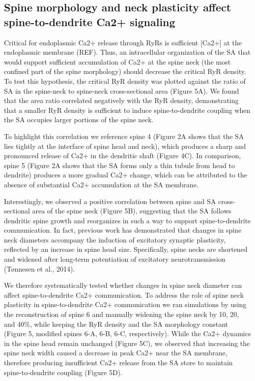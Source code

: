 \documentclass[fleqn,10pt]{wlscirep}
\begin{document}
\subsection*{Spine morphology and neck plasticity affect spine-to-dendrite Ca2+ signaling}Critical for endoplasmic Ca2+ release through RyRs is sufficient [Ca2+] at the endoplasmic membrane (REF). Thus, an intracellular organization of the SA that would support sufficient accumulation of Ca2+ at the spine neck (the most confined part of the spine morphology) should decrease the critical RyR density. To test this hypothesis, the critical RyR density was plotted against the ratio of SA in the spine-neck to spine-neck cross-sectional area (Figure 5A). We found that the area ratio correlated negatively with the RyR density, demonstrating that a smaller RyR density is sufficient to induce spine-to-dendrite coupling when the SA occupies larger portions of the spine neck.

		To highlight this correlation we reference spine 4 (Figure 2A shows that the SA lies tightly at the interface of spine head and neck), which produces a sharp and pronounced release of Ca2+ in the dendritic shaft (Figure 4C). In comparison, spine 5 (Figure 2A shows that the SA forms only a thin tubule from head to dendrite) produces a more gradual Ca2+ change, which can be attributed to the absence of substantial Ca2+ accumulation at the SA membrane.
		
		Interestingly, we observed a positive correlation between spine and SA cross-sectional area of the spine neck (Figure 5B), suggesting that the SA follows dendritic spine growth and reorganizes in such a way to support spine-to-dendrite communication. In fact, previous work has demonstrated that changes in spine neck diameters accompany the induction of excitatory synaptic plasticity, reflected by an increase in spine head size. Specifically, spine necks are shortened and widened after long-term potentiation of excitatory neurotransmission (Tønnesen et al., 2014). 
		
		We therefore systematically tested whether changes in spine neck diameter can affect spine-to-dendrite Ca2+ communication. To address the role of spine neck plasticity in spine-to-dendrite Ca2+ communication we ran simulations by using the reconstruction of spine 6 and manually widening the spine neck by 10, 20, and 40\%, while keeping the RyR density and the SA morphology constant (Figure 5, modified spines 6-A, 6-B, 6-C, respectively). While the Ca2+ dynamics in the spine head remain unchanged (Figure 5C), we observed that increasing the spine neck width caused a decrease in peak Ca2+ near the SA membrane, therefore producing insufficient Ca2+ release from the SA store to maintain spine-to-dendrite coupling (Figure 5D). 
		
\end{document}
